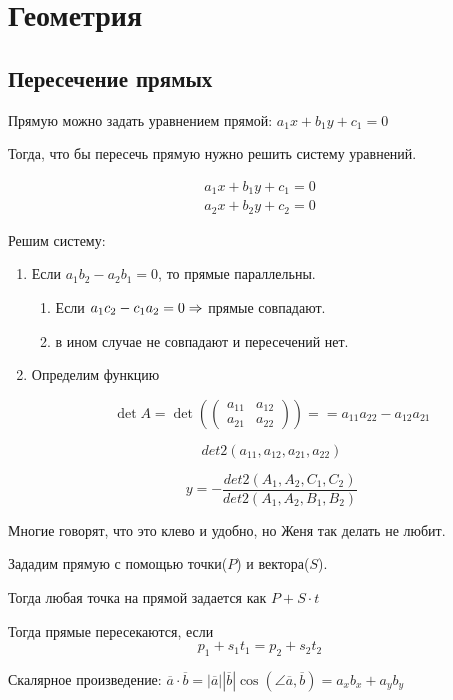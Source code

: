 ﻿\renewcommand{\vec}{\overline}
\chapter{Геометрия}

\section{Пересечение прямых}
Прямую можно задать уравнением прямой: $a_1x + b_1y + c_1 = 0$ 

Тогда, что бы пересечь прямую нужно решить систему уравнений. 

\begin{gather*}
a_1 x + b_1 y + c_1 = 0\\
a_2 x + b_2 y + c_2 = 0
\end{gather*}

Решим систему:
\begin{enumerate}
\item Если $a_1 b_2 - a_2 b_1 = 0$, то прямые параллельны.
    \begin{enumerate}
    \item Если $a_1 c_2  - c_1 a_2 = 0 \Rightarrow$ прямые совпадают.
    \item в ином случае не совпадают и пересечений нет. 
    \end{enumerate}
\item 
    Определим функцию 
    
    $$\det A = \det (\begin{pmatrix} a_{11} & a_{12}\\ a_{21} & a_{22} \end{pmatrix}) = 
    = a_{11}a_{22} - a_{12}a_{21}$$ 
   
    $$det2(a_{11}, a_{12}, a_{21}, a_{22})$$
   
    $$y = - \frac{det2(A_1, A_2, C_1, C_2)}{det2(A_1, A_2, B_1, B_2)}$$
\end{enumerate}

Многие говорят, что это клево и удобно, но Женя так делать не любит.

Зададим прямую с помощью точки($P$) и вектора($S$).

Тогда любая точка на прямой задается как $P + S \cdot t$

Тогда прямые пересекаются, если
$$p_1 + s_1 t_1 = p_2 + s_2 t_2$$

\begin{Def}
Скалярное произведение: $\vec{a} \cdot \vec{b} = |\vec{a}||\vec{b}|\cos(\angle \vec{a}, \vec{b}) = a_x b_x + a_y b_y$
\end{Def}

